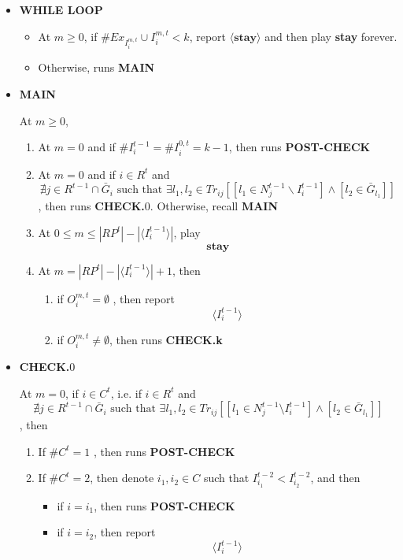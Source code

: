 \documentclass[12pt,letterpaper]{article}
\newtheorem*{main result}{Main Result}
\theoremstyle{definition}
\theoremstyle{remark}
\theoremstyle{claim}
\begin{document}
\begin{itemize}

\item \textbf{WHILE LOOP}
\begin{itemize}
\item At $m\geq 0$, if $\# Ex_{I^{m,t}_i}\cup I^{m,t}_i< k$, report $\langle \textbf{stay} \rangle$ and then play \textbf{stay} forever.
\item Otherwise, runs \textbf{MAIN }
\end{itemize}


\item \textbf{MAIN}

At $m\geq 0$, 

\begin{enumerate}
\item At $m=0$ and if $\# I^{t-1}_i=\# I^{0,t}_i= k-1$, then 
runs \textbf{POST-CHECK }


\item At $m=0$ and if $i\in R^t$ and
\[\nexists j\in R^{t-1}\cap\bar{G}_i \text{ such that }\exists l_1,l_2\in Tr_{ij}[[l_1\in N^{t-1}_j\backslash I^{t-1}_i] \wedge [l_2\in \bar{G}_{l_1}]]\]
, then runs \textbf{CHECK.$0$}. Otherwise, recall \textbf{MAIN}
\item At $0\leq m \leq |RP^t|-|\langle I^{t-1}_i \rangle|$, play
\[\textbf{stay}\]
\item At $m = |RP^t|-|\langle I^{t-1}_i \rangle|+1$, then
\begin{enumerate}
\item if $O^{m,t}_i= \emptyset$ 
, then report
\[\langle I^{t-1}_i \rangle\]
\item if $O^{m,t}_i\neq \emptyset$, then runs \textbf{CHECK.k}

\end{enumerate}

\end{enumerate}





\item \textbf{CHECK.$0$}

At $m=0$, if $i\in C^t$, i.e. if $i\in R^t$ and
\[\nexists j\in R^{t-1}\cap \bar{G}_i \text{ such that }\exists l_1,l_2\in Tr_{ij}[[l_1\in N^{t-1}_j\setminus I^{t-1}_i] \wedge [l_2\in \bar{G}_{l_1}]]\]
, then
\begin{enumerate}
\item If $\#C^t=1$
, then runs
\textbf{POST-CHECK }

\item If $\#C^t=2$, then denote $i_1,i_2\in C$ such that $I^{t-2}_{i_1}<I^{t-2}_{i_2}$, and then
\begin{itemize}
\item if $i=i_1$, then runs
\textbf{POST-CHECK }
\item if $i=i_2$, then report
\[\langle I^{t-1}_i \rangle\]


\end{itemize}
\end{enumerate}
\end{itemize}
\end{document}
